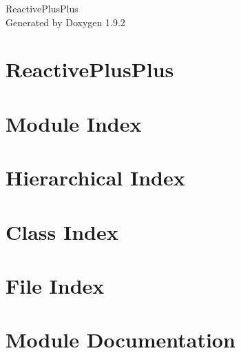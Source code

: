 \documentclass[twoside]{book}
\newcommand{\+}{\discretionary{\mbox{\scriptsize$\hookleftarrow$}}{}{}}
\newcommand{\clearemptydoublepage}{%
    \newpage{\pagestyle{empty}\cleardoublepage}%
  }
\begin{document}
  \raggedbottom
    \hypersetup{pageanchor=false,
                bookmarksnumbered=true,
                pdfencoding=unicode
               }
  \begin{titlepage}
  \vspace*{7cm}
  \begin{center}%
  {\Large Reactive\+Plus\+Plus}\\
  \vspace*{1cm}
  {\large Generated by Doxygen 1.9.2}\\
  \end{center}
  \end{titlepage}
  \clearemptydoublepage
  \tableofcontents
  \clearemptydoublepage
  \hypersetup{pageanchor=true}
\chapter{Reactive\+Plus\+Plus}
\label{index}\hypertarget{index}{}
\chapter{Module Index}

\chapter{Hierarchical Index}

\chapter{Class Index}

\chapter{File Index}

\chapter{Module Documentation}




\end{document}
